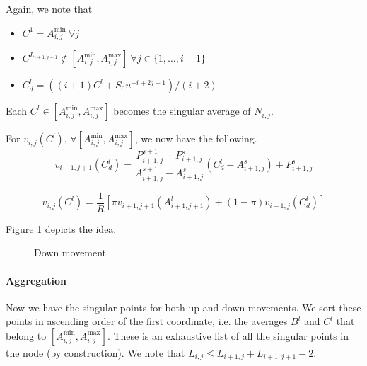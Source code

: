 Again, we note that
\begin{itemize}
\item $ C^1 = A_{i,j}^{\min} \ \forall j $
\item $ C^{L_{i+1,j+1}} \notin \left[ A_{i,j}^{\min}, A_{i,j}^{\max} \right] \ \forall j \in \{1, \dots, i-1 \} $
\item $ C^l_d = \left( (i+1) C^l + S_0 u^{-i+2j-1} \right) / ( i+2 ) $
\end{itemize}
Each $ C^l \in \left[ A_{i,j}^{\min}, A_{i,j}^{\max} \right] $ becomes the singular average of $ N_{i,j} $.

For $ v_{i,j}( C^l ) $, $ \forall \left[ A_{i,j}^{\min}, A_{i,j}^{\max} \right] $, we now have the following.
\begin{equation}
	\label{eq:asian-dn-lint}
	v_{i+1,j+1} \left( C^l_d \right) = \frac{ P_{i+1,j}^{s+1} - P_{i+1,j}^{s} }{ A_{i+1,j}^{s+1} - A_{i+1,j}^{s} } \left( C^l_d - A_{i+1,j}^{s} \right) + P_{i+1,j}^{s}
\end{equation}

\begin{equation}
	\label{eq:asian-dn-pr}
	v_{i,j}( C^l ) = \frac{1}{R} \left[ \pi v_{i+1,j+1} \left( A_{i+1,j+1}^l \right) + (1 - \pi) v_{i+1,j} \left( C^l_d \right) \right]
\end{equation}

Figure \ref{fig:asian-2tr-dn} depicts the idea.
\begin{figure}[h]
	
	\caption{Down movement}
	\label{fig:asian-2tr-dn}
\end{figure}


\paragraph{Aggregation}

Now we have the singular points for both up and down movements. We sort these points in ascending order of the first coordinate, i.e. the averages $ B^l $ and $ C^l $ that belong to $ \left[ A_{i,j}^{\min}, A_{i,j}^{\max} \right] $. These is an exhaustive list of all the singular points in the node (by construction). We note that $ L_{i,j} \le L_{i+1,j} + L_{i+1,j+1} - 2 $.

